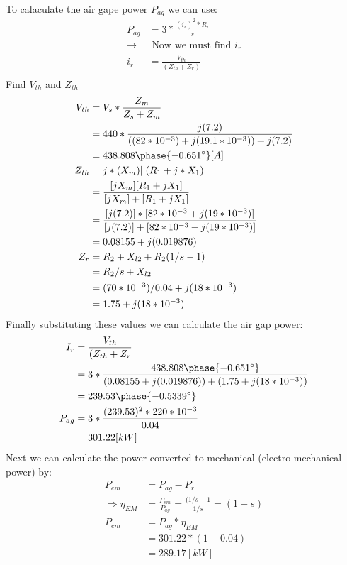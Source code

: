 \documentclass{article}
\begin{document}
To calaculate the air gape power $P_{ag}$ we can use:
\begin{align*}
    P_{ag} &= 3 * \frac{(i_r)^2* R_r}{s}\\
    \longrightarrow &\mbox{ Now we must find $i_r$}\\
    i_r &= \frac{V_{th}}{(Z_{th} + Z_r)} \\
\end{align*}
Find $V_{th}$ and $Z_{th}$\\
\begin{align*}
    V_{th} &= V_s * \frac{Z_m}{Z_s + Z_m}\\
    &= 440 * \frac{j(7.2)}{((82*10^{-3})+j(19.1*10^{-3}))+j(7.2)}\\
    &= 438.808 \phase{-0.651^{\circ}} [A]\\
    Z_{th} &= j * (X_m) || (R_1 + j * X_1)\\
    &= \frac{[j X_m][R_1+jX_1]}{[j X_m]+ [R_1 + jX_1]}\\
    &= \frac{[j(7.2)]*[82*10^{-3} + j(19*10^{-3})]}{[j(7.2)]+[82*10^{-3} + j(19*10^{-3})]}\\
    &= 0.08155 + j (0.019876)\\
    Z_r &= R_2 + X_{l2} + R_2(1/s-1) \\
    &= R_2/s + X_{l2} \\
    &= (70 * 10^{-3})/0.04 + j(18*10^{-3})\\
    &= 1.75+ j(18*10^{-3})
\end{align*}
Finally substituting these values we can calculate the air gap power:
\begin{align*}
    I_r &= \frac{V_{th}}{(Z_{th} + Z_r} \\
    &= 3 * \frac{438.808 \phase{-0.651^{\circ}}}{(0.08155 + j (0.019876))+(1.75+ j(18*10^{-3}))}\\
    &= 239.53 \phase{-0.5339^{\circ}}\\
    P_{ag} &= 3 * \frac{(239.53)^2* 220*10^{-3}}{0.04}\\
    &= 301.22 [kW]
\end{align*}
Next we can calculate the power converted to mechanical (electro-mechanical power) by:
\begin{align*}
    P_{em} &= P_{ag} - P_r \\
    \Longrightarrow \eta_{EM} &= \frac{P_{em}}{P_{ag}} = \frac{(1/s-1}{1/s} = (1-s)\\
    P_{em} &= P_{ag} * \eta_{EM} \\
    &= 301.22 * (1-0.04) \\
    &=289.17 [kW]
\end{align*}
\end{document}
